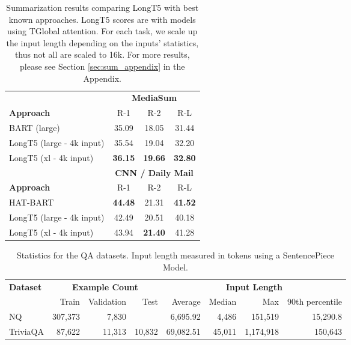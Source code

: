\documentclass[11pt]{article}
\begin{document}
\begin{table}
\begin{tabular}{lccc}
\toprule
& \multicolumn{3}{c}{\textbf{MediaSum}}  \\
\textbf{Approach} & R-1 & R-2 & R-L \\
\midrule
BART (large) & 35.09 & 18.05 & 31.44  \\
\midrule
LongT5 (large - 4k input) & 35.54 & 19.04 & 32.20 \\
LongT5 (xl - 4k input) & \textbf{36.15} & \textbf{19.66} & \textbf{32.80}\\
\toprule
&  \multicolumn{3}{c}{\textbf{CNN / Daily Mail}} \\
\textbf{Approach} & R-1 & R-2 & R-L\\
\midrule
HAT-BART & \textbf{44.48} & 21.31 & \textbf{41.52} \\
\midrule
LongT5 (large - 4k input) &  42.49 & 20.51 & 40.18 \\
LongT5 (xl - 4k input) &  43.94 & \textbf{21.40} & 41.28 \\
\bottomrule
\end{tabular}
\caption{Summarization results comparing LongT5 with best known approaches. LongT5 scores are with models using TGlobal attention. For each task, we scale up the input length depending on the inputs' statistics, thus not all are scaled to 16k. For more results, please see Section \ref{sec:sum_appendix} in the Appendix.}\label{tab:summarization_results}
\end{table}


\begin{table*}\small
    \centering
    \begin{tabular}{ p{1.45cm} | r r r | r r r r } \toprule
    \multirow{2}{*}{\textbf{Dataset}} & \multicolumn{3}{c}{\textbf{Example Count}} & \multicolumn{4}{c}{\textbf{Input Length}}  \\ 
    & Train & Validation & Test & Average & Median & Max & 90th percentile \\ \midrule
    NQ & 307,373 & 7,830 & & 6,695.92 & 4,486 & 151,519 & 15,290.8 \\
    TriviaQA & 87,622 & 11,313 & 10,832 & 69,082.51 & 45,011 & 1,174,918 & 150,643 \\
\bottomrule
    \end{tabular}
    \caption{Statistics for the QA datasets. Input length measured in tokens using a SentencePiece Model.}
    \label{tab:qa_stats}
\end{table*}
\end{document}
